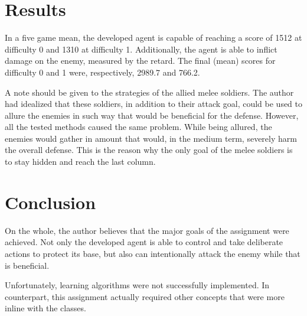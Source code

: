 \documentclass[conference]{IEEEtran}
\begin{document}
\section{Results}

In a five game mean, the developed agent is capable of reaching a score of 1512 at difficulty 0 and 1310 at difficulty 1. Additionally, the agent is able to inflict damage on the enemy, measured by the retard. The final (mean) scores for difficulty 0 and 1 were, respectively, 2989.7 and 766.2.

A note should be given to the strategies of the allied melee soldiers. The author had idealized that these soldiers, in addition to their attack goal, could be used to allure the enemies in such way that would be beneficial for the defense. However, all the tested methods caused the same problem. While being allured, the enemies would gather in amount that would, in the medium term, severely harm the overall defense. This is the reason why the only goal of the melee soldiers is to stay hidden and reach the last column.

\section{Conclusion}

On the whole, the author believes that the major goals of the assignment were achieved. Not only the developed agent is able to control and take deliberate actions to protect its base, but also can intentionally attack the enemy while that is beneficial. 

Unfortunately, learning algorithms were not successfully implemented. In counterpart, this assignment actually required other concepts that were more inline with the classes.








\end{document}
